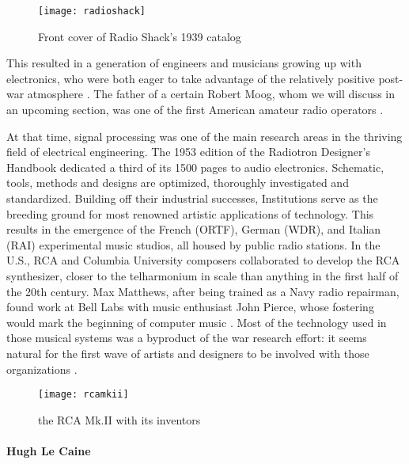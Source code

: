 	\begin{figure}[h!]
	  \caption{Front cover of Radio Shack's 1939 catalog}
	  \centering
	    \texttt{[image: radioshack]}
	\end{figure}

This resulted in a generation of engineers and musicians growing up with electronics, who were both eager to take advantage of the relatively positive post-war atmosphere \citep{holmes2002}. The father of a certain Robert Moog, whom we will discuss in an upcoming section, was one of the first American amateur radio operators \cite[p.12]{pinch2002}. 

At that time, signal processing was one of the main research areas in the thriving field of electrical engineering. The 1953 edition of the Radiotron Designer's Handbook \citep{langford1953} dedicated a third of its 1500 pages to audio electronics. Schematic, tools, methods and designs are optimized, thoroughly investigated and standardized. Building off their industrial successes, Institutions serve as the breeding ground for most renowned artistic applications of technology. This results in the emergence of the French (ORTF), German (WDR), and Italian (RAI) experimental music studios, all housed by public radio stations. In the U.S., RCA and Columbia University composers collaborated to develop the RCA synthesizer, closer to the telharmonium in scale than anything in the first half of the 20th century. Max Matthews, after being trained as a Navy radio repairman, found work at Bell Labs with music enthusiast John Pierce, whose fostering would mark the beginning of computer music \citep{park2009}. Most of the technology used in those musical systems was a byproduct of the war research effort: it seems natural for the first wave of artists and designers to be involved with those organizations \citep[p.81]{holmes2002}. 

	\begin{figure}[h!]
	  \caption{the RCA Mk.II with its inventors}
	  \centering
	    \texttt{[image: rcamkii]}
	\end{figure}

\paragraph{Hugh Le Caine}

